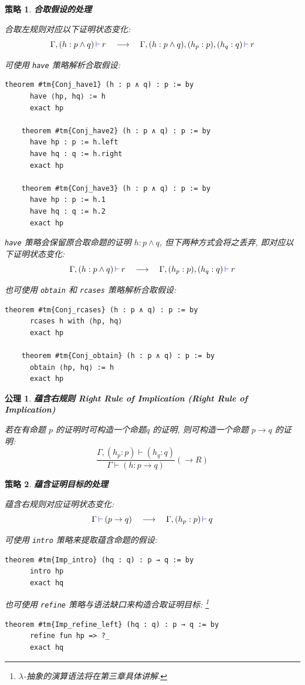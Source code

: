 \documentclass[UTF8]{ctexart}
\DeclareMathOperator{\0}{\mathbf{0}}                    %
\newcommand{\<}{\langle}
\renewcommand{\>}{\rangle}                              %
\newenvironment{thm_box}{
    \begin{tcolorbox}[enhanced, colback=thm_blue2, boxrule=0pt, frame hidden,
        borderline west={0.7mm}{0.1mm}{thm_blue1},breakable]
    }
    {\end{tcolorbox}}
\newenvironment{axm_box}{
    \begin{tcolorbox}[enhanced, colback=axm_yellow2, boxrule=0pt, frame hidden,
        borderline west={0.7mm}{0.1mm}{axm_yellow1},breakable]
    }
    {\end{tcolorbox}}
\theoremstyle{MyStyle} %
\newtheorem{axiom}{公理}[section]
\newenvironment{axm}[2]
{
    \begin{axm_box}
        \begin{axiom}
            \textbf{#1
                \ifx\relax#2\relax\else %
                    (#2) %
                \fi}
            \newline
}
{
        \end{axiom}
    \end{axm_box}
}
\newtheorem{mytactic}{策略}
\newenvironment{tactic}[1]
{
    \begin{thm_box}
        \begin{mytactic}
            \textbf{#1}
            \newline
}
{
        \end{mytactic}
    \end{thm_box}
}
\newcommand*{\lean}[1]{\texttt{\color{blue}#1}}
\newcommand{\Goal}{\texttt{\,\color{leanblue}\ensuremath{\vdash}\,}}
\begin{document}
        \begin{tactic}
            {合取假设的处理}
            合取左规则对应以下证明状态变化: 
            \[\Gamma, (h : p\land q)\Goal r\quad\longrightarrow\quad\Gamma, (h : p\land q), (h_p : p), (h_q : q)\Goal r\]

            可使用 \lean{have} 策略解析合取假设: 
            \begin{lstlisting}[style=lean]
    theorem #tm{Conj_have1} (h : p ∧ q) : p := by
      have ⟨hp, hq⟩ := h
      exact hp

    theorem #tm{Conj_have2} (h : p ∧ q) : p := by
      have hp : p := h.left
      have hq : q := h.right
      exact hp

    theorem #tm{Conj_have3} (h : p ∧ q) : p := by
      have hp : p := h.1
      have hq : q := h.2
      exact hp
            \end{lstlisting}

            \lean{have} 策略会保留原合取命题的证明 $h : p\land q$, 但下两种方式会将之丢弃, 即对应以下证明状态变化: 
            \[\Gamma, (h : p\land q)\Goal r\quad\longrightarrow\quad\Gamma, (h_p : p), (h_q : q)\Goal r\]
            
            也可使用 \lean{obtain} 和 \lean{rcases} 策略解析合取假设: 
            \begin{lstlisting}[style=lean]
    theorem #tm{Conj_rcases} (h : p ∧ q) : p := by
      rcases h with ⟨hp, hq⟩
      exact hp

    theorem #tm{Conj_obtain} (h : p ∧ q) : p := by
      obtain ⟨hp, hq⟩ := h
      exact hp
            \end{lstlisting}
        \end{tactic}
        

        \begin{axm}
            {蕴含右规则}
            {Right Rule of Implication}
            若在有命题 $p$ 的证明时可构造一个命题$q$ 的证明, 则可构造一个命题 $p\to q$ 的证明: 
            \[\frac{\Gamma, (h_p : p)\vdash(h_q : q)}{\Gamma\vdash(h : p\to q)}(\to R)\]
        \end{axm}

        \begin{tactic}
            {蕴含证明目标的处理}
            蕴含右规则对应证明状态变化: 
            \[\Gamma\Goal(p\to q)\quad\longrightarrow\quad\Gamma, (h_p : p)\Goal q\]
            
            可使用 \lean{intro} 策略来提取蕴含命题的假设: 
            \begin{lstlisting}[style=lean]
    theorem #tm{Imp_intro} (hq : q) : p → q := by
      intro hp
      exact hq
            \end{lstlisting}
            
            也可使用 \lean{refine} 策略与语法缺口来构造合取证明目标: \footnote{$\lambda$-抽象的演算语法将在第三章具体讲解. }
            \begin{lstlisting}[style=lean]
    theorem #tm{Imp_refine_left} (hq : q) : p → q := by
      refine fun hp => ?_
      exact hq
            \end{lstlisting}
        \end{tactic}
\end{document}
